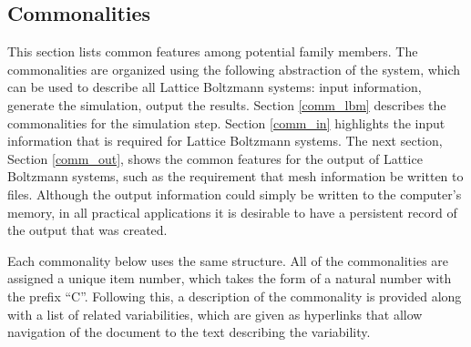 \documentclass[12pt, notitlepage]{article}
\begin{document}
\subsection{Commonalities}\label{comm_sec}

This section lists common features among potential family members. The commonalities are organized using the following abstraction of the system, which can be used to describe all Lattice Boltzmann systems: input information, generate the simulation, output the results. Section \ref{comm_lbm} describes the commonalities for the simulation step. Section \ref{comm_in} highlights the input information that is required for Lattice Boltzmann systems. The next section, Section \ref{comm_out}, shows the common features for the output of Lattice Boltzmann systems, such as the requirement that mesh information be written to files. Although the output information could simply be written to the computer’s memory, in all practical applications it is desirable to have a persistent record of the output that was created.

Each commonality below uses the same structure. All of the commonalities are assigned a unique item number, which takes the form of a natural number with the prefix ``C''. Following this, a description of the commonality is provided along with a list of related variabilities, which are given as hyperlinks that allow navigation of the document to the text describing the variability.  
\end{document}
